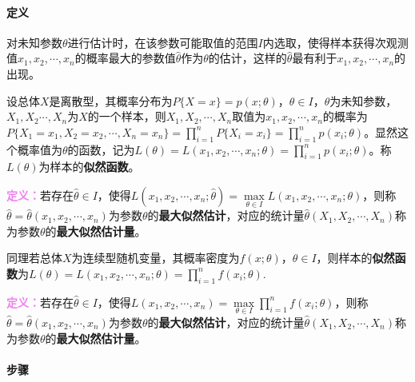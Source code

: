 \documentclass[UTF8, 12pt]{ctexart}
\begin{document}
\paragraph{定义} \leavevmode \medskip

对未知参数$\theta$进行估计时，在该参数可能取值的范围$I$内选取，使得样本获得次观测值$x_1,x_2,\cdots,x_n$的概率最大的参数值$\hat{\theta}$作为$\theta$的估计，这样的$\hat{\theta}$最有利于$x_1,x_2,\cdots,x_n$的出现。

设总体$X$是离散型，其概率分布为$P\{X=x\}=p(x;\theta)$，$\theta\in I$，$\theta$为未知参数，$X_1,X_2\cdots,X_n$为$X$的一个样本，则$X_1,X_2,\cdots,X_n$取值为$x_1,x_2,\cdots,x_n$的概率为$P\{X_1=x_1,X_2=x_2,\cdots,X_n=x_n\}=\prod\limits_{i=1}^nP\{X_i=x_i\}=\prod\limits_{i=1}^np(x_i;\theta)$。显然这个概率值为$\theta$的函数，记为$L(\theta)=L(x_1,x_2,\cdots,x_n;\theta)=\prod\limits_{i=1}^np(x_i;\theta)$。称$L(\theta)$为样本的\textbf{似然函数}。

\textcolor{violet}{\textbf{定义：}}若存在$\hat{\theta}\in I$，使得$L(x_1,x_2,\cdots,x_n;\hat{\theta})=\max\limits_{\theta\in I}L(x_1,x_2,\cdots,x_n;\theta)$，则称$\hat{\theta}=\hat{\theta}(x_1,x_2,\cdots,x_n)$为参数$\theta$的\textbf{最大似然估计}，对应的统计量$\hat{\theta}(X_1,X_2,\cdots,X_n)$称为参数$\theta$的\textbf{最大似然估计量}。

同理若总体$X$为连续型随机变量，其概率密度为$f(x;\theta)$，$\theta\in I$，则样本的\textbf{似然函数}为$L(\theta)=L(x_1,x_2,\cdots,x_n;\theta)=\prod\limits_{i=1}^nf(x_i;\theta)$.

\textcolor{violet}{\textbf{定义：}}若存在$\hat{\theta}\in I$，使得$L(x_1,x_2,\cdots,x_n)=\max\limits_{\theta\in I}\prod\limits_{i=1}^nf(x_i;\theta)$，则称$\hat{\theta}=\hat{\theta}(x_1,x_2,\cdots,x_n)$为参数$\theta$的\textbf{最大似然估计}，对应的统计量$\hat{\theta}(X_1,X_2,\cdots,X_n)$称为参数$\theta$的\textbf{最大似然估计量}。

\paragraph{步骤} \leavevmode \medskip
\end{document}
